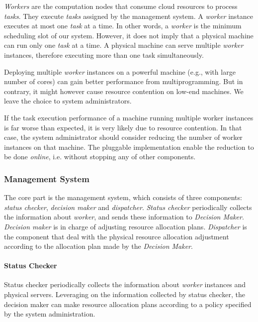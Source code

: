 {\em Workers} are the computation nodes that consume cloud resources to
process {\em tasks}.
They execute {\em tasks} assigned by the management system.
A {\em worker} instance executes at most one {\em task} at a time.
In other words, a {\em worker} is the minimum scheduling slot of our
system.
However, it does not imply that a physical machine can run only one {\em
task} at a time.
A physical machine can serve multiple {\em worker} instances, therefore
executing more than one task simultaneously.

Deploying multiple {\em worker} instances on a powerful machine (e.g.,
with large number of cores) can gain better performance from
multiprogramming.
But in contrary, it might however cause resource contention on low-end
machines.
We leave the choice to system administrators.

If the task execution performance of a machine running multiple worker
instances is far worse than expected, it is very likely due to resource
contention.
In that case, the system administrator should consider reducing the
number of worker instances on that machine.
The pluggable implementation enable the reduction to be done {\em
online}, i.e. without stopping any of other components.


\subsubsection{Management System}	%

The core part is the management system, which consists of three
components: {\em status checker}, {\em decision maker} and {\em
dispatcher}.
{\em Status checker} periodically collects the information about {\em
worker}, and sends these information to {\em Decision Maker}.
{\em Decision maker} is in charge of adjusting resource allocation
plans.
{\em Dispatcher} is the component that deal with the physical resource
allocation adjustment according to the allocation plan made by the {\em
Decision Maker}.


\paragraph{Status Checker}	%

Status checker periodically collects the information about {\em worker}
instances and physical servers.
Leveraging on the information collected by status checker, the decision
maker can make resource allocation plans according to a policy specified
by the system administration.

